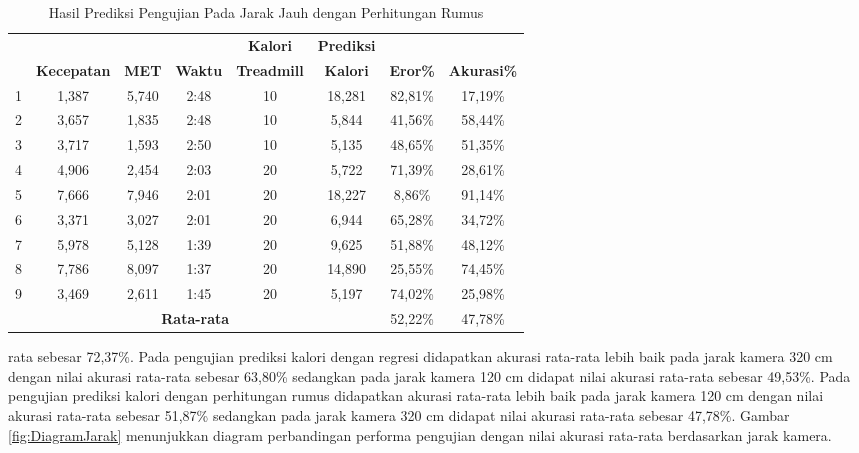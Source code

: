 \begin{longtable}{|c|c|c|c|c|c|c|c|}
  \caption{Hasil Prediksi Pengujian Pada Jarak Jauh dengan Perhitungan Rumus}
  \label{tb:PengujianJarakJauhAnalisaPrediksiPerhitungan}                                   \\
  \hline
  \rowcolor[HTML]{C0C0C0}
  & & & & \textbf{Kalori} & \textbf{Prediksi} & & \\
  \rowcolor[HTML]{C0C0C0}
  \multirow{-2}{*}{\textbf{Percobaan}} & \multirow{-2}{*}{\textbf{Kecepatan}} & \multirow{-2}{*}{\textbf{MET}} & \multirow{-2}{*}{\textbf{Waktu}} & \textbf{Treadmill} & \textbf{Kalori} & \multirow{-2}{*}{\textbf{Eror\%}} & \multirow{-2}{*}{\textbf{Akurasi\%}} \\
  \hline
  1   & 1,387   & 5,740    & 2:48    & 10   & 18,281   & 82,81\%     & 17,19\%   \\
  \hline
  2   & 3,657   & 1,835    & 2:48    & 10   & 5,844    & 41,56\%     & 58,44\%   \\
  \hline
  3   & 3,717   & 1,593    & 2:50    & 10   & 5,135    & 48,65\%     & 51,35\%   \\
  \hline
  4   & 4,906   & 2,454    & 2:03    & 20   & 5,722    & 71,39\%     & 28,61\%   \\
  \hline
  5   & 7,666   & 7,946    & 2:01    & 20   & 18,227   & 8,86\%      & 91,14\%   \\
  \hline
  6   & 3,371   & 3,027    & 2:01    & 20   & 6,944    & 65,28\%     & 34,72\%   \\
  \hline
  7   & 5,978   & 5,128    & 1:39    & 20   & 9,625    & 51,88\%     & 48,12\%   \\
  \hline
  8   & 7,786   & 8,097    & 1:37    & 20   & 14,890   & 25,55\%     & 74,45\%   \\
  \hline
  9   & 3,469   & 2,611    & 1:45    & 20   & 5,197    & 74,02\%     & 25,98\%   \\
  \hline

  \multicolumn{6}{|c|}{\textbf{Rata-rata}} & 52,22\% & 47,78\%  \\
  \hline
\end{longtable}

\noindent
rata sebesar 72,37\%. Pada pengujian prediksi kalori dengan regresi didapatkan akurasi rata-rata lebih baik pada jarak kamera 320 cm dengan nilai akurasi rata-rata sebesar 63,80\% sedangkan pada jarak kamera 120 cm didapat nilai akurasi rata-rata sebesar 49,53\%. Pada pengujian prediksi kalori dengan perhitungan rumus didapatkan akurasi rata-rata lebih baik pada jarak kamera 120 cm dengan nilai akurasi rata-rata sebesar 51,87\% sedangkan pada jarak kamera 320 cm didapat nilai akurasi rata-rata sebesar 47,78\%. Gambar \ref{fig:DiagramJarak} menunjukkan diagram perbandingan performa pengujian dengan nilai akurasi rata-rata berdasarkan jarak kamera.

